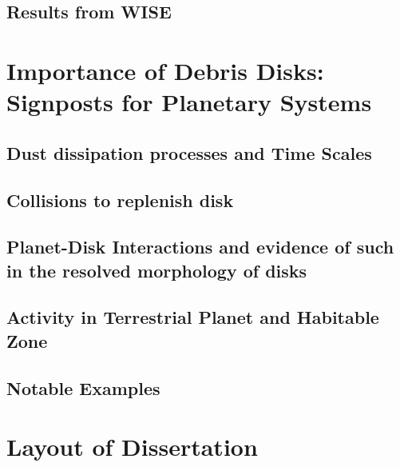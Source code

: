         \subsection{Results from WISE}\label{sec:past_wise}
        
        
    \section{Importance of Debris Disks: Signposts for Planetary Systems}
        
        \subsection{Dust dissipation processes and Time Scales}
        
        \subsection{Collisions to replenish disk}
        
        \subsection{Planet-Disk Interactions and evidence of such in the resolved morphology of disks}
    
    
        \subsection{Activity in Terrestrial Planet and Habitable Zone}
        
        
        \subsection{Notable Examples}

    \section{Layout of Dissertation}

        